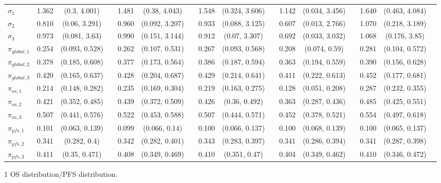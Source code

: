 \documentclass[AMA,STIX1COL]{WileyNJD-v2}
\begin{document}
\begin{landscape}
\begin{center}
\begin{table}[t]
\begin{tabular}{l c c c c c c c c c c c c c c c}
$\sigma_1$ & 1.362 & (0.3, 4.001) &  & 1.481 & (0.38, 4.043) &  & 1.548 & (0.324, 3.606) &  & 1.142 & (0.034, 3.456) &  & 1.640 & (0.463, 4.084) & \\
$\sigma_2$ & 0.810 & (0.06, 3.291) &  & 0.960 & (0.092, 3.207) &  & 0.933 & (0.088, 3.125) &  & 0.607 & (0.013, 2.766) &  & 1.070 & (0.218, 3.189) & \\
$\sigma_3$ & 0.973 & (0.081, 3.63) &  & 0.990 & (0.151, 3.144) &  & 0.912 & (0.07, 3.307) &  & 0.692 & (0.033, 3.032) &  & 1.068 & (0.176, 3.85) & \\
$\pi_{global, 1}$ & 0.254 & (0.093, 0.528) &  & 0.262 & (0.107, 0.531) &  & 0.267 & (0.093, 0.568) &  & 0.208 & (0.074, 0.59) &  & 0.281 & (0.104, 0.572) & \\
$\pi_{global, 2}$ & 0.378 & (0.185, 0.608) &  & 0.377 & (0.173, 0.564) &  & 0.386 & (0.187, 0.594) &  & 0.363 & (0.194, 0.559) &  & 0.390 & (0.156, 0.628) & \\
$\pi_{global, 3}$ & 0.420 & (0.165, 0.637) &  & 0.428 & (0.204, 0.687) &  & 0.429 & (0.214, 0.641) &  & 0.411 & (0.222, 0.613) &  & 0.452 & (0.177, 0.681) & \\
$\pi_{os, 1}$ & 0.214 & (0.148, 0.282) &  & 0.235 & (0.169, 0.304) &  & 0.219 & (0.163, 0.275) &  & 0.128 & (0.051, 0.208) &  & 0.287 & (0.232, 0.355) & \\
$\pi_{os, 2}$ & 0.421 & (0.352, 0.485) &  & 0.439 & (0.372, 0.509) &  & 0.426 & (0.36, 0.492) &  & 0.363 & (0.287, 0.436) &  & 0.485 & (0.425, 0.551) & \\
$\pi_{os, 3}$ & 0.507 & (0.441, 0.576) &  & 0.522 & (0.453, 0.588) &  & 0.507 & (0.444, 0.571) &  & 0.452 & (0.378, 0.521) &  & 0.554 & (0.497, 0.618) & \\
$\pi_{pfs, 1}$ & 0.101 & (0.063, 0.139) &  & 0.099 & (0.066, 0.14) &  & 0.100 & (0.066, 0.137) &  & 0.100 & (0.068, 0.139) &  & 0.100 & (0.065, 0.137) & \\
$\pi_{pfs, 2}$ & 0.341 & (0.282, 0.4) &  & 0.342 & (0.282, 0.401) &  & 0.343 & (0.283, 0.397) &  & 0.341 & (0.286, 0.394) &  & 0.341 & (0.287, 0.398) & \\
$\pi_{pfs, 3}$ & 0.411 & (0.35, 0.471) &  & 0.408 & (0.349, 0.469) &  & 0.410 & (0.351, 0.47) &  & 0.404 & (0.349, 0.462) &  & 0.410 & (0.346, 0.472) & \\
\bottomrule
\end{tabular}
\begin{tablenotes}%
\item[1] OS distribution/PFS distribution.
\end{tablenotes}
\end{table}
\end{center}
\end{landscape}
\end{document}
